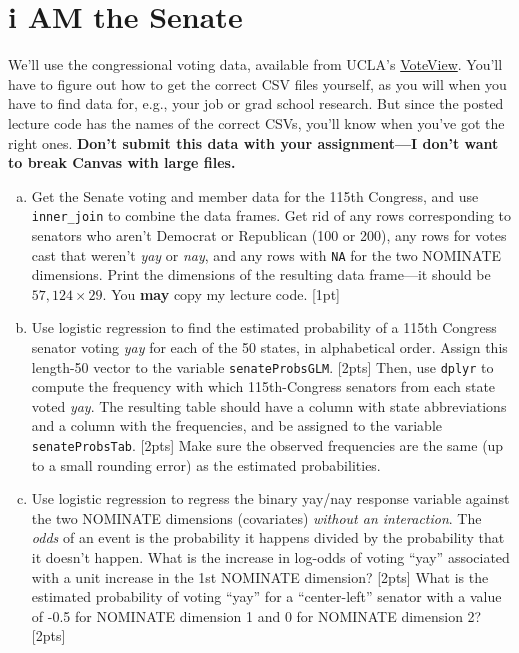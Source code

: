 \documentclass[12pt]{article}
\begin{document}
\section{i AM the Senate}

We'll use the congressional voting data, available from UCLA's \href{https://www.voteview.com/data}{VoteView}. You'll have to figure out how to get the correct CSV files yourself, as you will when you have to find data for, e.g., your job or grad school research. But since the posted lecture code has the names of the correct CSVs, you'll know when you've got the right ones. \textbf{Don't submit this data with your assignment---I don't want to break Canvas with large files.}

\begin{enumerate}[(a)]
	\item Get the Senate voting and member data for the 115th Congress, and use \verb|inner_join| to combine the data frames. Get rid of any rows corresponding to senators who aren't Democrat or Republican (100 or 200), any rows for votes cast that weren't \textit{yay} or \textit{nay}, and any rows with \verb|NA| for the two NOMINATE dimensions. Print the dimensions of the resulting data frame---it should be $57,124 \times 29$. You \textbf{may} copy my lecture code. [1pt]
	\item Use logistic regression to find the estimated probability of a 115th Congress senator voting \textit{yay} for each of the 50 states, in alphabetical order. Assign this length-50 vector to the variable \verb|senateProbsGLM|. [2pts] Then, use \verb|dplyr| to compute the frequency with which 115th-Congress senators from each state voted \textit{yay}. The resulting table should have a column with state abbreviations and a column with the frequencies, and be assigned to the variable \verb|senateProbsTab|. [2pts] Make sure the observed frequencies are the same (up to a small rounding error) as the estimated probabilities.
	\item Use logistic regression to regress the binary yay/nay response variable against the two NOMINATE dimensions (covariates) \textit{without an interaction}. The \textit{odds} of an event is the probability it happens divided by the probability that it doesn't happen. What is the increase in log-odds of voting ``yay'' associated with a unit increase in the 1st NOMINATE dimension? [2pts] What is the estimated probability of voting ``yay'' for a ``center-left'' senator with a value of -0.5 for NOMINATE dimension 1 and 0 for NOMINATE dimension 2? [2pts]
\end{enumerate}
\end{document}
